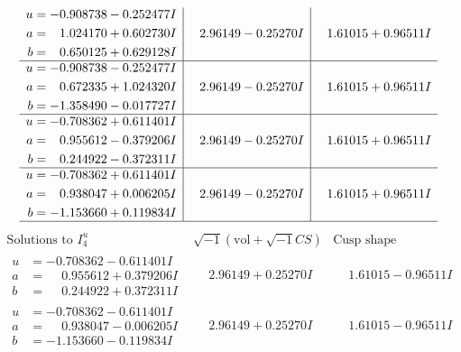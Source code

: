 \documentclass[1p]{elsarticle_modified}
\theoremstyle{definition}
\newcommand{\I}{\sqrt{-1}}
\begin{document}
$$\begin{array}{c|c|c}
\begin{aligned}
u &= -0.908738 - 0.252477 I \\
a &= \phantom{-}1.024170 + 0.602730 I \\
b &= \phantom{-}0.650125 + 0.629128 I\end{aligned}
 & \phantom{-}2.96149 - 0.25270 I & \phantom{-}1.61015 + 0.96511 I \\ \hline\begin{aligned}
u &= -0.908738 - 0.252477 I \\
a &= \phantom{-}0.672335 + 1.024320 I \\
b &= -1.358490 - 0.017727 I\end{aligned}
 & \phantom{-}2.96149 - 0.25270 I & \phantom{-}1.61015 + 0.96511 I \\ \hline\begin{aligned}
u &= -0.708362 + 0.611401 I \\
a &= \phantom{-}0.955612 - 0.379206 I \\
b &= \phantom{-}0.244922 - 0.372311 I\end{aligned}
 & \phantom{-}2.96149 - 0.25270 I & \phantom{-}1.61015 + 0.96511 I \\ \hline\begin{aligned}
u &= -0.708362 + 0.611401 I \\
a &= \phantom{-}0.938047 + 0.006205 I \\
b &= -1.153660 + 0.119834 I\end{aligned}
 & \phantom{-}2.96149 - 0.25270 I & \phantom{-}1.61015 + 0.96511 I\\
 \hline 
 \end{array}$$\newpage$$\begin{array}{c|c|c}  
\text{Solutions to }I^u_{4}& \I (\text{vol} + \sqrt{-1}CS) & \text{Cusp shape}\\
 \hline 
\begin{aligned}
u &= -0.708362 - 0.611401 I \\
a &= \phantom{-}0.955612 + 0.379206 I \\
b &= \phantom{-}0.244922 + 0.372311 I\end{aligned}
 & \phantom{-}2.96149 + 0.25270 I & \phantom{-}1.61015 - 0.96511 I \\ \hline\begin{aligned}
u &= -0.708362 - 0.611401 I \\
a &= \phantom{-}0.938047 - 0.006205 I \\
b &= -1.153660 - 0.119834 I\end{aligned}
 & \phantom{-}2.96149 + 0.25270 I & \phantom{-}1.61015 - 0.96511 I \\ \hline\begin{aligned}

\end{aligned}
\end{array}$$
\end{document}
